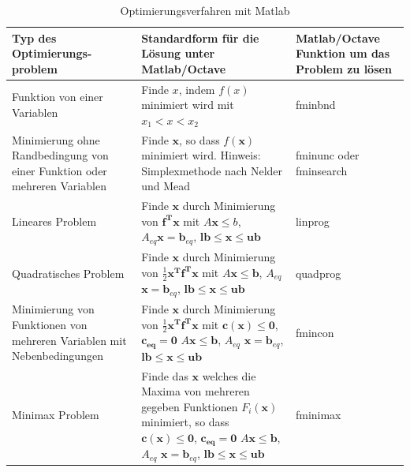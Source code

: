 \begin{table}[!ht]
	\caption{Optimierungsverfahren mit Matlab}
	\centering
	\begin{tabular}{p{5cm} | >{\centering\arraybackslash} p{6cm} | p{4cm}}  \hline
		Typ des Optimierungs- \newline problem &  Standardform für die Lösung unter Matlab/Octave &  Matlab/Octave Funktion um das Problem zu lösen \\[1ex]
		\hline \hline
		Funktion von einer  \newline Variablen  & Finde $x$, indem $f(x)$ minimiert wird mit
		$x_1 < x < x_2$ & \textsf{fminbnd} \\[1ex] \hline
		Minimierung ohne Randbedingung von einer Funktion oder mehreren Variablen &
		Finde $\mathbf x$, so dass $f(\mathbf x)$ minimiert wird.
		Hinweis: Simplexmethode nach Nelder und Mead &
		\textsf{fminunc} oder \newline \textsf{fminsearch} \\[1ex] \hline
		Lineares Problem & Finde $\mathbf x $ durch Minimierung von $\mathbf{f^T x}$ mit $A \mathbf x \le b$, $A_{eq} \mathbf x = \mathbf b_{eq}$, \newline
		$\mathbf{lb} \le \mathbf{x} \le \mathbf{ub}$ & \textsf{linprog} \\[1ex] \hline
		Quadratisches Problem & Finde $\mathbf x $ durch Minimierung von $\frac{1}{2} \mathbf{x^T}\mathbf{f^T x}$ mit $A \mathbf x \le \mathbf b$,
		\newline $A_{eq}$ $\mathbf x = \mathbf b_{eq}$, \newline
		$\mathbf{lb} \le \mathbf{x} \le \mathbf{ub}$ & \textsf{quadprog} \\[1ex] \hline
		Minimierung von Funktionen von mehreren Variablen mit Nebenbedingungen &
		Finde $\mathbf x $ durch Minimierung von $\frac{1}{2} \mathbf{x^T}\mathbf{f^T x}$ mit $\mathbf{c(x) \le 0}$,
		$\mathbf{c_{eq} = 0}$ \newline
		$A \mathbf x \le \mathbf b$,
		$A_{eq}$ $\mathbf x = \mathbf b_{eq}$, \newline
		$\mathbf{lb} \le \mathbf x \le \mathbf{ub}$ & \textsf{fmincon} \\[1ex] \hline
		Minimax Problem & Finde das  $\mathbf x $ welches die Maxima
		von mehreren gegeben Funktionen $F_i(\mathbf x)$ minimiert,
		so dass  $\mathbf{c(x) \le 0}$,
		$\mathbf{c_{eq} = 0}$ \newline
		$A \mathbf x \le \mathbf b$,
		$A_{eq}$ $\mathbf x = \mathbf b_{eq}$, \newline
		$\mathbf{lb} \le \mathbf x \le \mathbf{ub}$ & \textsf{fminimax} \\[1ex] \hline
	\end{tabular}
	\label{tab:Optimierungsverfahren}
\end{table}

